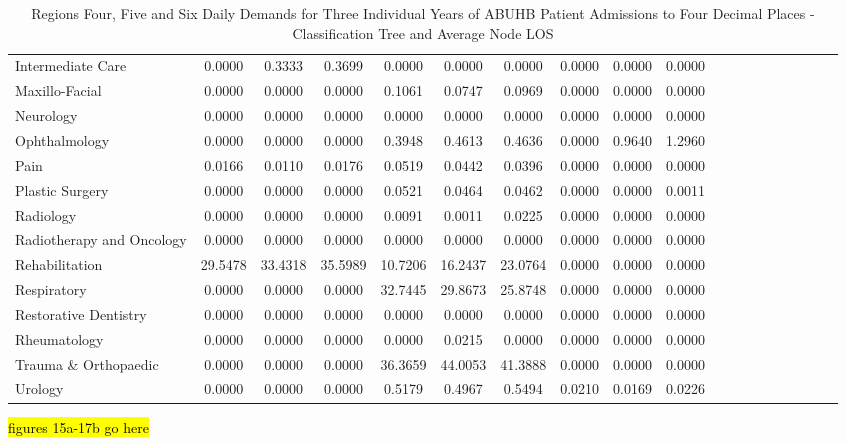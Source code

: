 \documentclass[thesis.tex]{subfiles}
\begin{document}
\begin{landscape}
\begin{table}[h!]
{\begin{tabular}{lcccccccccccccccccc}
Intermediate Care&	0.0000&	0.3333&	0.3699&	0.0000&	0.0000&	0.0000&	0.0000&	0.0000&	0.0000\\
Maxillo-Facial&	0.0000&	0.0000&	0.0000&	0.1061&	0.0747&	0.0969&	0.0000&	0.0000&	0.0000\\
Neurology&	0.0000&	0.0000&	0.0000&	0.0000&	0.0000&	0.0000&	0.0000&	0.0000&	0.0000\\
Ophthalmology&	0.0000&	0.0000&	0.0000&	0.3948&	0.4613&	0.4636&	0.0000&	0.9640&	1.2960\\
Pain&	0.0166&	0.0110&	0.0176&	0.0519&	0.0442&	0.0396&	0.0000&	0.0000&	0.0000\\
Plastic Surgery&	0.0000&	0.0000&	0.0000&	0.0521&	0.0464&	0.0462&	0.0000&	0.0000&	0.0011\\
Radiology&	0.0000&	0.0000&	0.0000&	0.0091&	0.0011&	0.0225&	0.0000&	0.0000&	0.0000\\
Radiotherapy and Oncology&	0.0000&	0.0000&	0.0000&	0.0000&	0.0000&	0.0000&	0.0000&	0.0000&	0.0000\\
Rehabilitation&	29.5478&	33.4318&	35.5989&	10.7206&	16.2437&	23.0764&	0.0000&	0.0000&	0.0000\\
Respiratory&	0.0000&	0.0000&	0.0000&	32.7445&	29.8673&	25.8748&	0.0000&	0.0000&	0.0000\\
Restorative Dentistry&	0.0000&	0.0000&	0.0000&	0.0000&	0.0000&	0.0000&	0.0000&	0.0000&	0.0000\\
Rheumatology&	0.0000&	0.0000&	0.0000&	0.0000&	0.0215&	0.0000&	0.0000&	0.0000&	0.0000\\
Trauma \& Orthopaedic&	0.0000&	0.0000&	0.0000&	36.3659&	44.0053&	41.3888&	0.0000&	0.0000&	0.0000\\
Urology&	0.0000&	0.0000&	0.0000&	0.5179&	0.4967&	0.5494&	0.0210&	0.0169&	0.0226\\\bottomrule


    \end{tabular}  } 
\caption{Regions Four, Five and Six Daily Demands for Three Individual Years of ABUHB Patient Admissions to Four Decimal Places - Classification Tree and Average Node LOS}
    \label{apptab:LinkedDemands7b}
\end{table}
\end{landscape}

\hl{figures 15a-17b go here}
\end{document}
